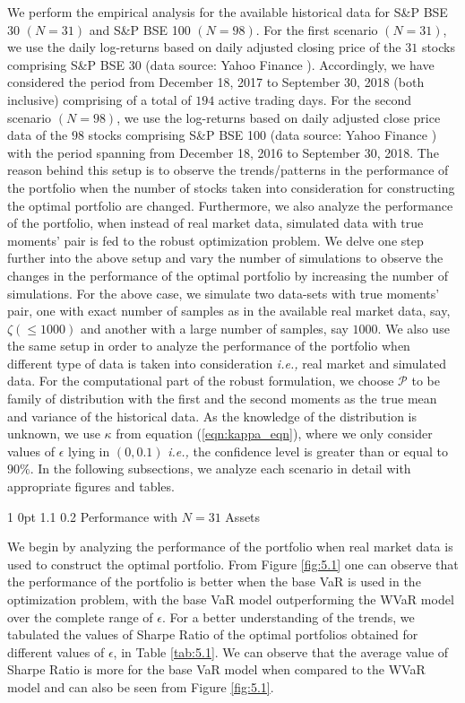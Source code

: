 \documentclass[12pt]{article}
\makeatletter
\numberwithin{equation}{section}
\renewcommand{\subsubsection}{
  \@startsection
  {subsubsection}%
  {1}%
  {0pt}%
  {1.1\baselineskip}%
  {0.2\baselineskip}%
  {\sc \centering}%
}
\makeatother
\begin{document}
We perform the empirical analysis for the available historical data for S\&P BSE 30 $(N=31)$ and S\&P BSE 100 $(N=98)$. For the first scenario $(N=31)$, we use the daily log-returns based on daily adjusted closing price of the $31$ stocks comprising S\&P BSE 30 (data source: Yahoo Finance \cite{yf}). Accordingly, we have considered the period from December 18, 2017 to September 30, 2018 (both inclusive) comprising of a total of $194$ active trading days. For the second scenario $(N=98)$, we use the log-returns based on daily adjusted close price data of the $98$ stocks comprising S\&P BSE 100 (data source: Yahoo Finance \cite{yf}) with the period spanning from December 18, 2016 to September 30, 2018. The reason behind this setup is to observe the trends/patterns in the performance of the portfolio when the number of stocks taken into consideration for constructing the optimal portfolio are changed. Furthermore, we also analyze the performance of the portfolio, when instead of real market data, simulated data with true moments' pair is fed to the robust optimization problem. We delve one step further into the above setup and vary the number of simulations to observe the changes in the performance of the optimal portfolio by increasing the number of simulations. For the above case, we simulate two data-sets with true moments' pair, one with exact number of samples as in the available real market data, say, $\zeta(\leq 1000)$ and another with a large number of samples, say $1000$. We also use the same setup in order to analyze the performance of the portfolio when different type of data is taken into consideration \textit{i.e.,} real market and simulated data. For the computational part of the robust formulation, we choose $\mathcal{P}$ to be family of distribution with the first and the second moments as the true mean and variance of the historical data. As the knowledge of the distribution is unknown, we use $\kappa$ from equation (\ref{eqn:kappa_eqn}), where we only consider values of $\epsilon$ lying in $(0,0.1)$ \textit{i.e.,} the confidence level is greater than or equal to $90\%$. In the following subsections, we analyze each scenario in detail with appropriate figures and tables.

\subsubsection{Performance with $N=31$ Assets}

We begin by analyzing the performance of the portfolio when real market data is used to construct the optimal portfolio. From Figure \ref{fig:5.1} one can observe that the performance of the portfolio is better when the base VaR is used in the optimization problem, with the base VaR model outperforming the WVaR model over the complete range of $\epsilon$. For a better understanding of the trends, we tabulated the values of Sharpe Ratio of the optimal portfolios obtained for different values of $\epsilon$, in Table \ref{tab:5.1}. We can observe that the average value of Sharpe Ratio is more for the base VaR model when compared to the WVaR model and can also be seen from Figure \ref{fig:5.1}.
\end{document}
